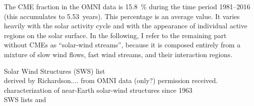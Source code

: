 The CME fraction in the OMNI data is \SI{15.8}{\%} during the time period 1981--2016 (this accumulates to 5.53~years).
This percentage is an average value. It varies heavily with the solar activity cycle and with the appearance of individual active regions on the solar surface. In the following, I refer to the remaining part without CMEs as ``solar-wind streams'', because it is composed entirely from a mixture of slow wind flows, fast wind streams, and their interaction regions.



Solar Wind Structures (SWS) list\\
derived by Richardson.... from OMNI data (only?)
permission received.\\
characterization of near-Earth solar-wind structures since 1963\\
SWS lists \citep{Richardson2000} and \citep{Richardson2012}



